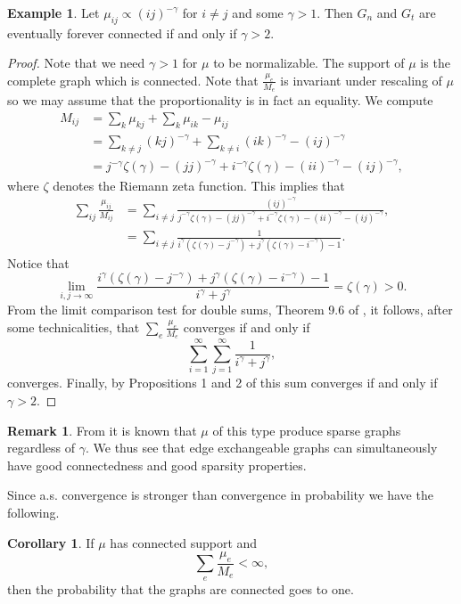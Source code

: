 \documentclass[12pt]{article}
\theoremstyle{definition}
\newtheorem{corollary}[proposition]{Corollary}
\newtheorem{remark}[proposition]{Remark}
\newtheorem{example}[proposition]{Example}
\begin{document}
\begin{example} \label{gamma > 2} Let $\mu_{ij} \propto (ij)^{-\gamma}$ for $i \neq j$ and some $\gamma > 1$. Then $G_n$ and $G_t$ are eventually forever connected if and only if $\gamma > 2$.
\end{example}\begin{proof} Note that we need $\gamma > 1$ for $\mu$ to be normalizable. The support of $\mu$ is the complete graph which is connected. Note that $\frac{\mu_{e}}{M_{e}}$ is invariant under rescaling of $\mu$ so we may assume that the proportionality is in fact an equality. We compute
\begin{align*}
    M_{ij} &= \sum_{k}\mu_{kj}+\sum_k\mu_{ik}-\mu_{ij} \\
    &=\sum_{k \neq j}(kj)^{-\gamma}+\sum_{k \neq i}(ik)^{-\gamma}-(ij)^{-\gamma} \\
    &= j^{-\gamma}\zeta(\gamma)-(jj)^{-\gamma}+i^{-\gamma}\zeta(\gamma)-(ii)^{-\gamma}-(ij)^{-\gamma},
\end{align*} where $\zeta$ denotes the Riemann zeta function. This implies that 
\begin{align} \label{gamma double sum}
    \sum_{ij}\frac{\mu_{ij}}{M_{ij}} &= \sum_{i \neq j}\frac{(ij)^{-\gamma}}{j^{-\gamma}\zeta(\gamma)-(jj)^{-\gamma}+i^{-\gamma}\zeta(\gamma)-(ii)^{-\gamma}-(ij)^{-\gamma}}, \\
    &= \sum_{i \neq j}\frac{1}{i^\gamma(\zeta(\gamma)-j^{-\gamma})+j^\gamma(\zeta(\gamma)-i^{-\gamma})-1}.
\end{align} 
Notice that 
$$\lim_{i,j \rightarrow \infty} \frac{i^\gamma(\zeta(\gamma)-j^{-\gamma})+j^\gamma(\zeta(\gamma)-i^{-\gamma})-1}{i^\gamma+j^\gamma} = \zeta(\gamma) > 0.$$ 
From the limit comparison test for double sums, Theorem 9.6 of \cite{mursaleen_2013_double}, it follows, after some technicalities, that $\sum_e \frac{\mu_e}{M_e}$ converges if and only if $$\sum_{i=1}^\infty \sum_{j=1}^\infty \frac{1}{i^\gamma+j^\gamma},$$ converges. Finally, by Propositions 1 and 2 of \cite{zanu_2025_on} this sum converges if and only if $\gamma > 2$.
\end{proof}
\begin{remark}
    From \cite{janson_2017_on} it is known that $\mu$ of this type produce sparse graphs regardless of $\gamma$. We thus see that edge exchangeable graphs can simultaneously have good connectedness and good sparsity properties.
\end{remark}
Since a.s. convergence is stronger than convergence in probability we have the following.
\begin{corollary}\label{marginal pass} If $\mu$ has connected support and $$\sum_e \frac{\mu_e}{M_e} < \infty,$$ then the probability that the graphs are connected goes to one.
\end{corollary}
\end{document}
